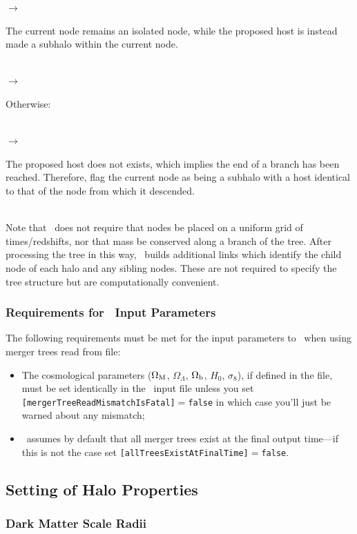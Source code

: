 \noindent\hspace{30mm} $\rightarrow$ \parbox[t]{125mm}{The current node remains an isolated node, while the proposed host is instead made a subhalo within the current node.}\\

\noindent\hspace{20mm} $\rightarrow$ \parbox[t]{135mm}{Otherwise:}\\

\noindent\hspace{25mm} $\rightarrow$ \parbox[t]{130mm}{The proposed host does not exists, which implies the end of a branch has been reached. Therefore, flag the current node as being a subhalo with a host identical to that of the node from which it descended.}\\

Note that \glc\ does not require that nodes be placed on a uniform grid of times/redshifts, nor that mass be conserved along a branch of the tree. After processing the tree in this way, \glc\ builds additional links which identify the child node of each halo and any sibling nodes. These are not required to specify the tree structure but are computationally convenient.

\subsubsection{Requirements for \glc\ Input Parameters}

The following requirements must be met for the input parameters to \glc\ when using merger trees read from file:
\begin{itemize}
 \item The cosmological parameters ($\Omega_{\rm M}$, $\Omega_\Lambda$, $\Omega_{\rm b}$, $H_0$, $\sigma_8$), if defined in the file, must be set identically in the \glc\ input file unless you set {\tt [mergerTreeReadMismatchIsFatal]}$=${\tt false} in which case you'll just be warned about any mismatch;
 \item \glc\ assumes by default that all merger trees exist at the final output time---if this is not the case set {\tt [allTreesExistAtFinalTime]}$=${\tt false}.
\end{itemize}

\subsection{Setting of Halo Properties}

\subsubsection{Dark Matter Scale Radii}

